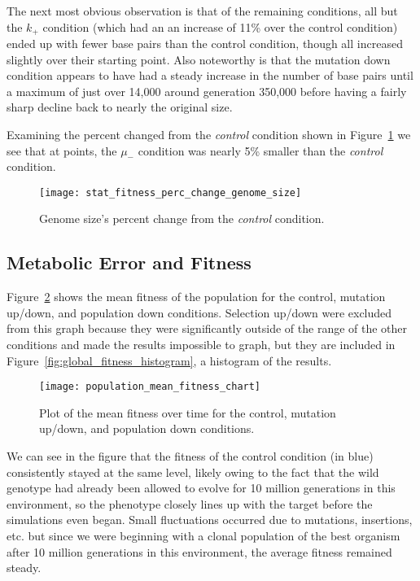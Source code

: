 The next most obvious observation is that of the remaining conditions, all but the $k_+$ condition (which had an an increase of 11\% over the control condition) ended up with fewer base pairs than the control condition, though all increased slightly over their starting point. Also noteworthy is that the mutation down condition appears to have had a steady increase in the number of base pairs until a maximum of just over 14,000 around generation 350,000 before having a fairly sharp decline back to nearly the original size. 

Examining the percent changed from the \textit{control} condition shown in Figure~\ref{fig:genome_size_percent_change} we see that at points, the $\mu_-$ condition was nearly 5\% smaller than the \textit{control} condition. 

\begin{figure}[H]
	\centering
	\texttt{[image: stat\_fitness\_perc\_change\_genome\_size]}
	\caption[Genome size - percent change]{Genome size's percent change from the \textit{control} condition.}
	\label{fig:genome_size_percent_change}
\end{figure}


\subsection{Metabolic Error and Fitness}
Figure~\ref{fig:mean_fitness_plot} shows the mean fitness of the population for the control, mutation up/down, and population down conditions. Selection up/down were excluded from this graph because they were significantly outside of the range of the other conditions and made the results impossible to graph, but they are included in Figure~\ref{fig:global_fitness_histogram}, a histogram of the results.

\begin{figure}[H]
	\texttt{[image: population\_mean\_fitness\_chart]}
	\caption[Mean fitness]{Plot of the mean fitness over time for the control, mutation up/down, and population down conditions.}
	\label{fig:mean_fitness_plot}
\end{figure}

We can see in the figure that the fitness of the control condition (in blue) consistently stayed at the same level, likely owing to the fact that the wild genotype had already been allowed to evolve for 10 million generations in this environment, so the phenotype closely lines up with the target before the simulations even began. Small fluctuations occurred due to mutations, insertions, etc. but since we were beginning with a clonal population of the best organism after 10 million generations in this environment, the average fitness remained steady. 

